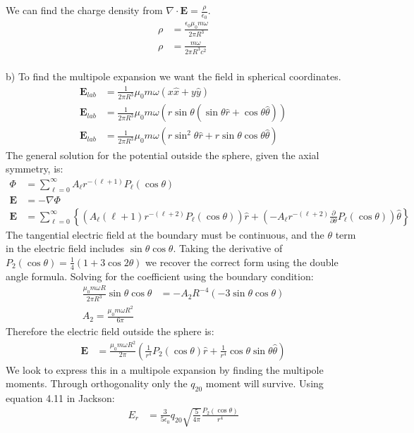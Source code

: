 \documentclass[a4paper,11pt]{article}
\numberwithin{equation}{section}
\newcommand{\bv}[1]{\mathbf{#1}}
\newcommand{\ez}{\epsilon_0}
\newcommand{\lrp}[1]{\left({#1}\right)}
\newcommand{\lrb}[1]{\left\{{#1}\right\}}
\begin{document}
We can find the charge density from $\nabla \cdot \bv{E} = \frac{\rho}{\ez}$.
\begin{align}
 \rho &= \frac{\ez \mu_0 m \omega}{2\pi R^3}\\
 \rho &= \frac{m \omega}{2\pi R^3 c^2}
\end{align}
\\
b) To find the multipole expansion we want the field in spherical coordinates. 
\begin{align}
 \bv{E}_{lab} &= \frac{1}{2\pi R^3}\mu_0 m \omega (x\hat{x}+y\hat{y})\\
 \bv{E}_{lab} &= \frac{1}{2\pi R^3}\mu_0 m \omega (r\sin{\theta}(\sin{\theta}\hat{r}+\cos{\theta}\hat{\theta}))\\
 \bv{E}_{lab} &= \frac{1}{2\pi R^3}\mu_0 m \omega (r\sin^2{\theta}\hat{r}+r\sin{\theta}\cos{\theta}\hat{\theta})
\end{align}
The general solution for the potential outside the sphere, given the axial symmetry, is:
\begin{align}
 \Phi &= \sum_{\ell=0}^\infty A_\ell r^{-(\ell+1)}P_\ell(\cos{\theta})\\
 \bv{E} &= -\nabla \Phi\\
 \bv{E} &= \sum_{\ell=0}^\infty\lrb{ \lrp{A_\ell(\ell+1)r^{-(\ell+2)}P_\ell(\cos{\theta})}\hat{r}+\lrp{-A_\ell r^{-(\ell+2)}\frac{\partial}{\partial \theta}P_\ell(\cos{\theta})}\hat{\theta} }
\end{align}
The tangential electric field at the boundary must be continuous, and the $\theta$ term in the electric field includes $\sin{\theta}\cos{\theta}$.
Taking the derivative of $P_2(\cos{\theta})=\frac{1}{4}(1+3\cos{2\theta})$ we recover the correct form using the double angle formula. 
Solving for the coefficient using the boundary condition:
\begin{align}
 \frac{\mu_0 m \omega R}{2\pi R^3}\sin{\theta}\cos{\theta} &= -A_2 R^{-4}(-3\sin{\theta}\cos{\theta})\\
 A_2 = \frac{\mu_0 m \omega R^2}{6\pi}
\end{align}
Therefore the electric field outside the sphere is:
\begin{align}
 \bv{E} &= \frac{\mu_0 m \omega R^2}{2\pi}\lrp{\frac{1}{r^4}P_2(\cos{\theta})\hat{r}+\frac{1}{r^4}\cos{\theta}\sin{\theta}\hat{\theta}}
\end{align}
We look to express this in a multipole expansion by finding the multipole moments. 
Through orthogonality only the $q_{20}$ moment will survive.
Using equation 4.11 in Jackson:
\begin{align}
 E_r &= \frac{3}{5\ez}q_{20}\sqrt{\frac{5}{4\pi}}\frac{P_2(\cos{\theta})}{r^4}
\end{align}
\end{document}
